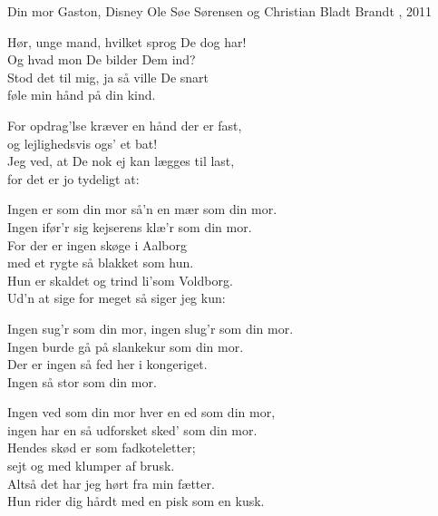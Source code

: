\begin{song}{Din mor}
  {} %
  {Gaston, Disney} %
  {Ole Søe Sørensen og Christian Bladt Brandt} %
  {\TKET{}, 2011} %
  {\NotCCLIed} %

  \begin{SBSection*}
    Hør, unge mand, hvilket sprog De dog har!\\
    Og hvad mon De bilder Dem ind?\\
    Stod det til mig, ja så ville De snart\\
    føle min hånd på din kind.
  \end{SBSection*}

  \begin{SBSection*}
    For opdrag’lse kræver en hånd der er fast,\\
    og lejlighedsvis ogs’ et bat!\\
    Jeg ved, at De nok ej kan lægges til last,\\
    for det er jo tydeligt at:
  \end{SBSection*}

  \begin{SBVerse}
    Ingen er som din mor så’n en mær som din mor.\\
    Ingen ifør’r sig kejserens klæ’r som din mor.\\
    For der er ingen skøge i Aalborg\\
    med et rygte så blakket som hun.\\
    Hun er skaldet og trind li’som Voldborg.\\
    Ud’n at sige for meget så siger jeg kun:
  \end{SBVerse}

  \begin{SBVerse}
    Ingen sug’r som din mor, ingen slug’r som din mor.\\
    Ingen burde gå på slankekur som din mor.\\
    Der er ingen så fed her i kongeriget.\\
    Ingen så stor som din mor.
  \end{SBVerse}

  \begin{SBVerse}
    Ingen ved som din mor hver en ed som din mor,\\
    ingen har en så udforsket sked’ som din mor.\\
    Hendes skød er som fadkoteletter;\\
    sejt og med klumper af brusk.\\
    Altså det har jeg hørt fra min fætter.\\
    Hun rider dig hårdt med en pisk som en kusk.
  \end{SBVerse}


\end{song}
